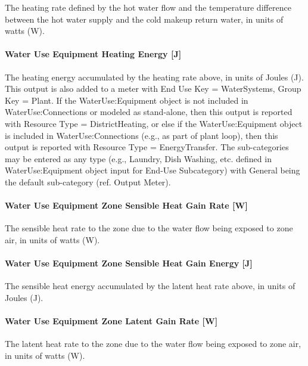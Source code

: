 The heating rate defined by the hot water flow and the temperature difference between the hot water supply and the cold makeup return water, in units of watts (W).

\paragraph{Water Use Equipment Heating Energy {[}J{]}}\label{water-use-equipment-heating-energy-j}

The heating energy accumulated by the heating rate above, in units of Joules (J). This output is also added to a meter with End Use Key = WaterSystems, Group Key = Plant. If the WaterUse:Equipment object is not included in WaterUse:Connections or modeled as stand-alone, then this output is reported with Resource Type = DistrictHeating, or else if the WaterUse:Equipment object is included in WaterUse:Connections (e.g., as part of plant loop), then this output is reported with Resource Type = EnergyTransfer. The sub-categories may be entered as any type (e.g., Laundry, Dish Washing, etc. defined in WaterUse:Equipment object input for End-Use Subcategory) with General being the default sub-category (ref. Output Meter).

\paragraph{Water Use Equipment Zone Sensible Heat Gain Rate {[}W{]}}\label{water-use-equipment-zone-sensible-heat-gain-rate-w}

The sensible heat rate to the zone due to the water flow being exposed to zone air, in units of watts (W).

\paragraph{Water Use Equipment Zone Sensible Heat Gain Energy {[}J{]}}\label{water-use-equipment-zone-sensible-heat-gain-energy-j}

The sensible heat energy accumulated by the latent heat rate above, in units of Joules (J).

\paragraph{Water Use Equipment Zone Latent Gain Rate {[}W{]}}\label{water-use-equipment-zone-latent-gain-rate-w}

The latent heat rate to the zone due to the water flow being exposed to zone air, in units of watts (W).


